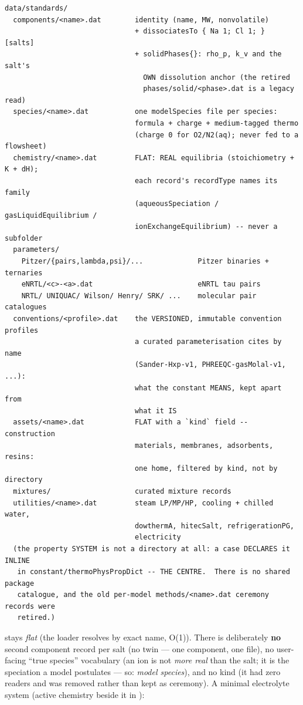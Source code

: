 \documentclass[11pt,a4paper]{article}
\begin{document}
\begin{lstlisting}
data/standards/
  components/<name>.dat        identity (name, MW, nonvolatile)
                               + dissociatesTo { Na 1; Cl 1; }  [salts]
                               + solidPhases{}: rho_p, k_v and the salt's
                                 OWN dissolution anchor (the retired
                                 phases/solid/<phase>.dat is a legacy read)
  species/<name>.dat           one modelSpecies file per species:
                               formula + charge + medium-tagged thermo
                               (charge 0 for O2/N2(aq); never fed to a flowsheet)
  chemistry/<name>.dat         FLAT: REAL equilibria (stoichiometry + K + dH);
                               each record's recordType names its family
                               (aqueousSpeciation / gasLiquidEquilibrium /
                               ionExchangeEquilibrium) -- never a subfolder
  parameters/
    Pitzer/{pairs,lambda,psi}/...             Pitzer binaries + ternaries
    eNRTL/<c>-<a>.dat                         eNRTL tau pairs
    NRTL/ UNIQUAC/ Wilson/ Henry/ SRK/ ...    molecular pair catalogues
  conventions/<profile>.dat    the VERSIONED, immutable convention profiles
                               a curated parameterisation cites by name
                               (Sander-Hxp-v1, PHREEQC-gasMolal-v1, ...):
                               what the constant MEANS, kept apart from
                               what it IS
  assets/<name>.dat            FLAT with a `kind` field -- construction
                               materials, membranes, adsorbents, resins:
                               one home, filtered by kind, not by directory
  mixtures/                    curated mixture records
  utilities/<name>.dat         steam LP/MP/HP, cooling + chilled water,
                               dowthermA, hitecSalt, refrigerationPG,
                               electricity
  (the property SYSTEM is not a directory at all: a case DECLARES it INLINE
   in constant/thermoPhysPropDict -- THE CENTRE.  There is no shared package
   catalogue, and the old per-model methods/<name>.dat ceremony records were
   retired.)
\end{lstlisting}

 stays \emph{flat} (the loader resolves  by
exact name, O(1)).  There is deliberately \textbf{no} second component record
per salt (no  twin --- one component, one file), no
user-facing ``true species'' vocabulary (an ion is not \emph{more real} than
the salt; it is the speciation a model postulates --- so: \emph{model
species}), and no  kind (it had zero readers and was
removed rather than kept as ceremony).  A minimal electrolyte system
(active chemistry beside it in ):
\end{document}
